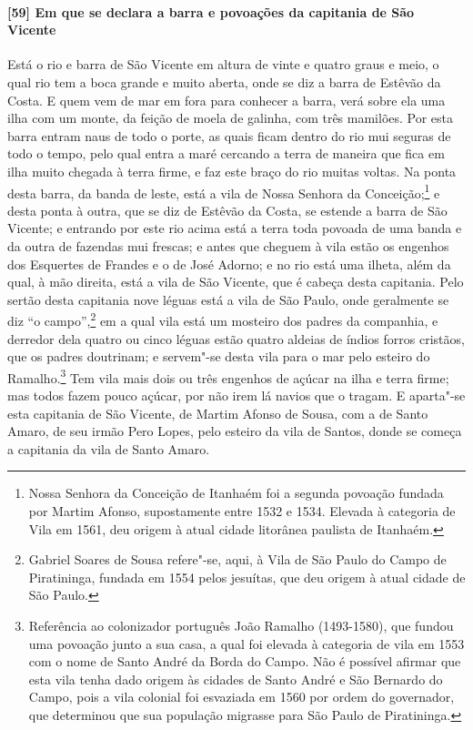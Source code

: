 \paragraph{[59] Em que se declara a barra e povoações da capitania de São Vicente} \quad
Está o rio e barra de São Vicente em altura de vinte e quatro graus e meio, o qual rio tem
a boca grande e muito aberta, onde se diz a barra de Estêvão da Costa. E quem vem de mar
em fora para conhecer a barra, verá sobre ela uma ilha com um monte, da feição de moela de
galinha, com três mamilões. Por esta barra entram naus de todo o porte, as quais ficam
dentro do rio mui seguras de todo o tempo, pelo qual entra a maré cercando a terra de
maneira que fica em ilha muito chegada à terra firme, e faz este braço do rio muitas
voltas. Na ponta desta barra, da banda de leste, está a vila de Nossa Senhora da
Conceição;\footnote{ Nossa Senhora da Conceição de Itanhaém foi a segunda povoação fundada
por Martim Afonso, supostamente entre 1532 e 1534. Elevada à categoria de Vila em 1561,
deu origem à atual cidade litorânea paulista de Itanhaém.} e desta ponta à outra, que se
diz de Estêvão da Costa, se estende a barra de São Vicente; e entrando por este rio acima
está a terra toda povoada de uma banda e da outra de fazendas mui frescas; e antes que
cheguem à vila estão os engenhos dos Esquertes de Frandes e o de José Adorno; e no rio
está uma ilheta, além da qual, à mão direita, está a vila de São Vicente, que é cabeça
desta capitania. Pelo sertão desta capitania nove léguas está a vila de São Paulo, onde
geralmente se diz ``o campo'',\footnote{ Gabriel Soares de Sousa refere"-se, aqui, à Vila de
São Paulo do Campo de Piratininga, fundada em 1554 pelos jesuítas, que deu origem à atual
cidade de São Paulo.} em a qual vila está um mosteiro dos padres da companhia, e derredor
dela quatro ou cinco léguas estão quatro aldeias de índios forros cristãos, que os padres
doutrinam; e servem"-se desta vila para o mar pelo esteiro do Ramalho.\footnote{ Referência
ao colonizador português João Ramalho (1493-1580), que fundou uma povoação junto a sua
casa, a qual foi elevada à categoria de vila em 1553 com o nome de Santo André da Borda do
Campo. Não é possível afirmar que esta vila tenha dado origem às cidades de Santo André e
São Bernardo do Campo, pois a vila colonial foi esvaziada em 1560 por ordem do
governador, que determinou que sua população migrasse para São Paulo de Piratininga.}
Tem vila mais dois ou três engenhos de açúcar na ilha e terra firme; mas todos fazem pouco
açúcar, por não irem lá navios que o tragam. E aparta"-se esta capitania de São Vicente, de
Martim Afonso de Sousa, com a de Santo Amaro, de seu irmão Pero Lopes, pelo esteiro da
vila de Santos, donde se começa a capitania da vila de Santo Amaro.

